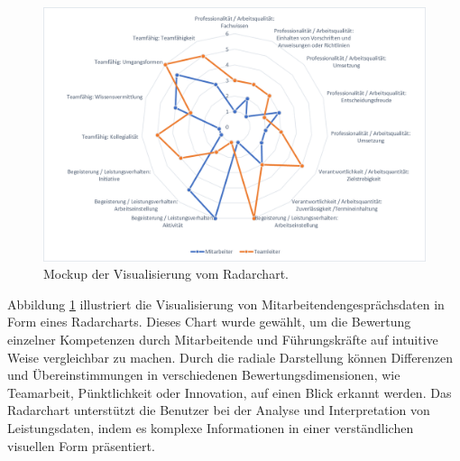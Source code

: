 \begin{figure}[h!]
    \centering
    \includegraphics[width=\textwidth]
{images/radarchart.png}
    \caption{Mockup der Visualisierung vom Radarchart.}
    \label{fig:mockup2}
\end{figure}
\noindent
Abbildung \ref{fig:mockup2} illustriert die Visualisierung von Mitarbeitendengesprächsdaten in Form eines Radarcharts. Dieses Chart wurde gewählt, um die Bewertung einzelner Kompetenzen durch Mitarbeitende und Führungskräfte auf intuitive Weise vergleichbar zu machen. Durch die radiale Darstellung können Differenzen und Übereinstimmungen in verschiedenen Bewertungsdimensionen, wie Teamarbeit, Pünktlichkeit oder Innovation, auf einen Blick erkannt werden. Das Radarchart unterstützt die Benutzer bei der Analyse und Interpretation von Leistungsdaten, indem es komplexe Informationen in einer verständlichen visuellen Form präsentiert.

